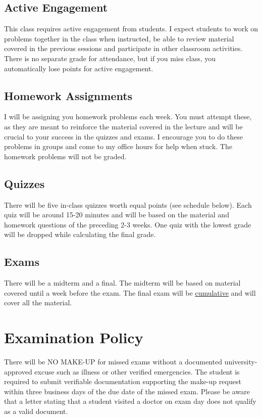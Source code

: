 \documentclass{./../Latex/syllabus}
\begin{document}
\subsection*{Active Engagement}
This class requires active engagement from students. I expect students to work on problems together in the class when instructed, be able to review material covered in the previous sessions and participate in other classroom activities. There is no separate grade for attendance, but if you miss class, you automatically lose points for active engagement.

\subsection*{Homework Assignments}
I will be assigning you homework problems each week. You must attempt these, as they are meant to reinforce the material covered in the lecture and will be crucial to your success in the quizzes and exams. I encourage you to do these problems in groups and come to my office hours for help when stuck. The homework problems will not be graded.

\subsection*{Quizzes}
There will be five in-class quizzes worth equal points (see schedule below). Each quiz will be around 15-20 minutes and will be based on the material and homework questions of the preceding 2-3 weeks. One quiz with the lowest grade will be dropped while calculating the final grade.  

\subsection*{Exams}
There will be a midterm and a final. The midterm will be based on material covered until a week before the exam. The final exam will be \underline{cumulative} and will cover all the material. 

\section*{Examination Policy}
There will be NO MAKE-UP for missed exams without a documented university-approved excuse such as illness or other verified emergencies. The student is required to submit verifiable documentation supporting the make-up request within three business days of the due date of the missed exam. Please be aware that a letter stating that a student visited a doctor on exam day does not qualify as a valid document.
\end{document}
